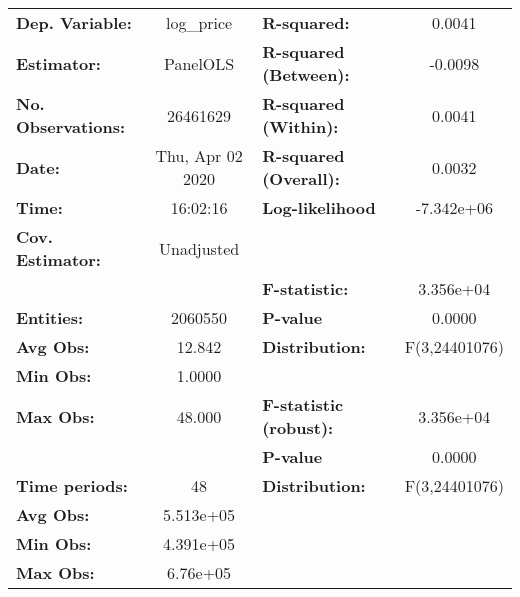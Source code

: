 \documentclass{report}
\begin{document}
\begin{center}
\begin{tabular}{lclc}
\toprule
\textbf{Dep. Variable:}      &     log\_price     & \textbf{  R-squared:         }   &      0.0041      \\
\textbf{Estimator:}          &      PanelOLS      & \textbf{  R-squared (Between):}  &     -0.0098      \\
\textbf{No. Observations:}   &      26461629      & \textbf{  R-squared (Within):}   &      0.0041      \\
\textbf{Date:}               &  Thu, Apr 02 2020  & \textbf{  R-squared (Overall):}  &      0.0032      \\
\textbf{Time:}               &      16:02:16      & \textbf{  Log-likelihood     }   &    -7.342e+06    \\
\textbf{Cov. Estimator:}     &     Unadjusted     & \textbf{                     }   &                  \\
\textbf{}                    &                    & \textbf{  F-statistic:       }   &    3.356e+04     \\
\textbf{Entities:}           &      2060550       & \textbf{  P-value            }   &      0.0000      \\
\textbf{Avg Obs:}            &       12.842       & \textbf{  Distribution:      }   &  F(3,24401076)   \\
\textbf{Min Obs:}            &       1.0000       & \textbf{                     }   &                  \\
\textbf{Max Obs:}            &       48.000       & \textbf{  F-statistic (robust):} &    3.356e+04     \\
\textbf{}                    &                    & \textbf{  P-value            }   &      0.0000      \\
\textbf{Time periods:}       &         48         & \textbf{  Distribution:      }   &  F(3,24401076)   \\
\textbf{Avg Obs:}            &     5.513e+05      & \textbf{                     }   &                  \\
\textbf{Min Obs:}            &     4.391e+05      & \textbf{                     }   &                  \\
\textbf{Max Obs:}            &      6.76e+05      & \textbf{                     }   &                  \\
\bottomrule
\end{tabular}
\begin{tabular}{lcccccc}

\end{tabular}
\end{center}
\end{document}
